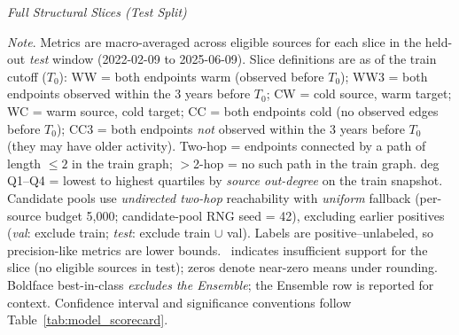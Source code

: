 \begin{landscape}
\pagestyle{landscape}
\begin{table}[p] 
  \centering
  \caption[\textit{Full Structural Slices (Test Split)}]{\textit{Full Structural Slices (Test Split)}}
  \label{tab:struct_slices_test}
  
\resizebox{\linewidth}{!}{}

  \captionsetup{justification=raggedright,singlelinecheck=false}
  \caption*{\footnotesize \textit{Note}. Metrics are macro-averaged across eligible sources for each slice in the held-out \textit{test} window (2022-02-09 to 2025-06-09).
  Slice definitions are as of the train cutoff ($T_0$):
  WW = both endpoints warm (observed before $T_0$); 
  WW3 = both endpoints observed within the 3 years before $T_0$; 
  CW = cold source, warm target; 
  WC = warm source, cold target; 
  CC = both endpoints cold (no observed edges before $T_0$); 
  CC3 = both endpoints \emph{not} observed within the 3 years before $T_0$ (they may have older activity).
  Two-hop = endpoints connected by a path of length $\leq 2$ in the train graph; 
  $>$2-hop = no such path in the train graph.
  deg Q1--Q4 = lowest to highest quartiles by \emph{source out-degree} on the train snapshot.
  Candidate pools use \emph{undirected two-hop} reachability with \emph{uniform} fallback (per-source budget 5{,}000; candidate-pool RNG seed = 42), excluding earlier positives (\textit{val}: exclude train; \textit{test}: exclude train $\cup$ val).
  Labels are positive--unlabeled, so precision-like metrics are lower bounds.
  \NA\ indicates insufficient support for the slice (no eligible sources in test); zeros denote near-zero means under rounding.
  Boldface best-in-class \emph{excludes the Ensemble}; the Ensemble row is reported for context.
  Confidence interval and significance conventions follow Table~\ref{tab:model_scorecard}.}
\end{table}
\end{landscape}
\pagestyle{fancy}

